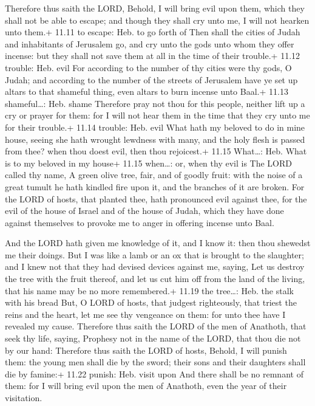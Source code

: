  Therefore thus saith the LORD, Behold, I will bring evil
upon them, which they shall not be able to escape; and though they shall
cry unto me, I will not hearken unto them.+ 11.11 to escape: Heb. to go
forth of  Then shall the cities of Judah and inhabitants of
Jerusalem go, and cry unto the gods unto whom they offer incense: but
they shall not save them at all in the time of their trouble.+ 11.12
trouble: Heb. evil  For according to the number of thy
cities were thy gods, O Judah; and according to the number of the
streets of Jerusalem have ye set up altars to that shameful thing, even
altars to burn incense unto Baal.+ 11.13 shameful\ldots: Heb. shame
 Therefore pray not thou for this people, neither lift up a
cry or prayer for them: for I will not hear them in the time that they
cry unto me for their trouble.+ 11.14 trouble: Heb. evil 
What hath my beloved to do in mine house, seeing she hath wrought
lewdness with many, and the holy flesh is passed from thee? when thou
doest evil, then thou rejoicest.+ 11.15 What\ldots: Heb. What is to my
beloved in my house+ 11.15 when\ldots: or, when thy evil is
 The LORD called thy name, A green olive tree, fair, and of
goodly fruit: with the noise of a great tumult he hath kindled fire upon
it, and the branches of it are broken.  For the LORD of
hosts, that planted thee, hath pronounced evil against thee, for the
evil of the house of Israel and of the house of Judah, which they have
done against themselves to provoke me to anger in offering incense unto
Baal.

 And the LORD hath given me knowledge of it, and I know
it: then thou shewedst me their doings.  But I was like a
lamb or an ox that is brought to the slaughter; and I knew not that they
had devised devices against me, saying, Let us destroy the tree with the
fruit thereof, and let us cut him off from the land of the living, that
his name may be no more remembered.+ 11.19 the tree\ldots: Heb. the
stalk with his bread  But, O LORD of hosts, that judgest
righteously, that triest the reins and the heart, let me see thy
vengeance on them: for unto thee have I revealed my cause. 
Therefore thus saith the LORD of the men of Anathoth, that seek thy
life, saying, Prophesy not in the name of the LORD, that thou die not by
our hand:  Therefore thus saith the LORD of hosts, Behold,
I will punish them: the young men shall die by the sword; their sons and
their daughters shall die by famine:+ 11.22 punish: Heb. visit upon
 And there shall be no remnant of them: for I will bring
evil upon the men of Anathoth, even the year of their visitation.

